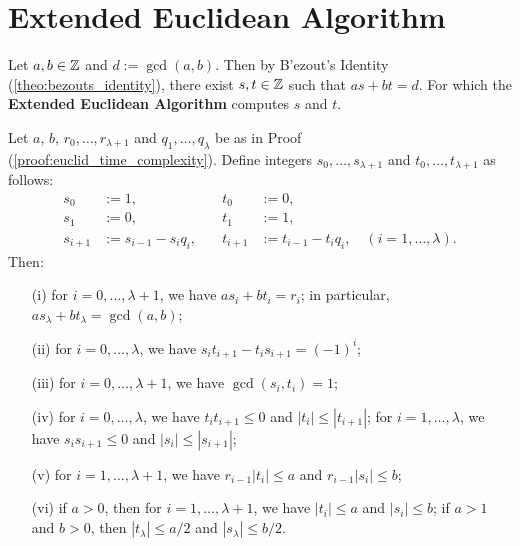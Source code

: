 \newpage 

\section{Extended Euclidean Algorithm}

\noindent
Let $a,b \in \mathbb{Z}$ and $d:= \gcd(a,b)$. Then by B'ezout's Identity (\ref{theo:bezouts_identity}), there exist $s,t \in \mathbb{Z}$ such that $as + bt = d$. For which the \textbf{Extended Euclidean Algorithm} computes $s$ and $t$.

\begin{theo}

    Let $a$, $b$, $r_0, \dots, r_{\lambda+1}$ and $q_1, \dots, q_{\lambda}$ be as in Proof (\ref{proof:euclid_time_complexity}). Define integers $s_0, \dots, s_{\lambda+1}$ and $t_0, \dots, t_{\lambda+1}$ as follows:
    \[
    \begin{aligned}
        s_0 &:= 1, \quad & t_0 &:= 0, \\
        s_1 &:= 0, \quad & t_1 &:= 1, \\
        s_{i+1} &:= s_{i-1} - s_i q_i, \quad & t_{i+1} &:= t_{i-1} - t_i q_i, \quad (i = 1, \dots, \lambda).
    \end{aligned}
    \]
    Then:
    \begin{itemize}
        \item[(i)] for $i = 0, \dots, \lambda+1$, we have $a s_i + b t_i = r_i$; in particular, $a s_{\lambda} + b t_{\lambda} = \gcd(a, b)$;
        \item[(ii)] for $i = 0, \dots, \lambda$, we have $s_i t_{i+1} - t_i s_{i+1} = (-1)^i$;
        \item[(iii)] for $i = 0, \dots, \lambda+1$, we have $\gcd(s_i, t_i) = 1$;
        \item[(iv)] for $i = 0, \dots, \lambda$, we have $t_i t_{i+1} \leq 0$ and $|t_i| \leq |t_{i+1}|$; for $i = 1, \dots, \lambda$, we have $s_i s_{i+1} \leq 0$ and $|s_i| \leq |s_{i+1}|$;
        \item[(v)] for $i = 1, \dots, \lambda+1$, we have $r_{i-1} | t_i | \leq a$ and $r_{i-1} | s_i | \leq b$;
        \item[(vi)] if $a > 0$, then for $i = 1, \dots, \lambda+1$, we have $|t_i| \leq a$ and $|s_i| \leq b$; if $a > 1$ and $b > 0$, then $|t_{\lambda}| \leq a/2$ and $|s_{\lambda}| \leq b/2$.
    \end{itemize}
\end{theo}

